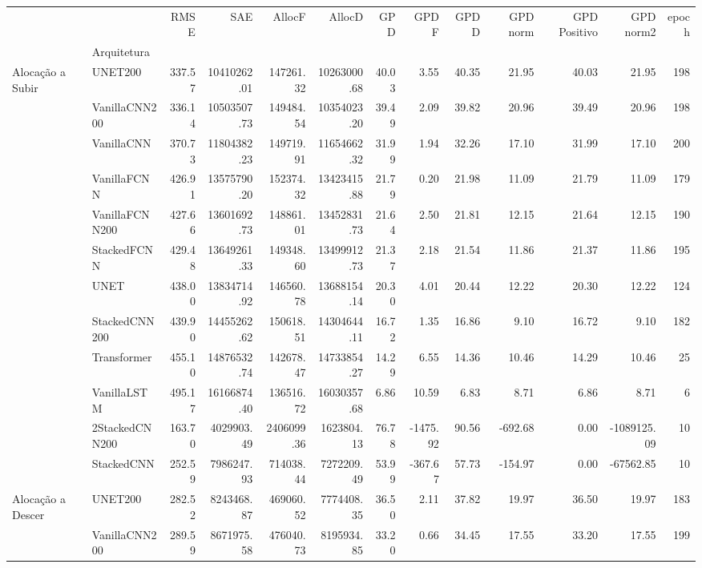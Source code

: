 \begin{tabular}{llrrrrrrrrrrr}
\toprule
 &  & RMSE & SAE & AllocF & AllocD & GPD & GPD F & GPD D & GPD norm & GPD Positivo & GPD norm2 & epoch \\
 & Arquitetura &  &  &  &  &  &  &  &  &  &  &  \\
\midrule
\multirow[t]{12}{*}{Alocação a Subir} & UNET200 & 337.57 & 10410262.01 & 147261.32 & 10263000.68 & 40.03 & 3.55 & 40.35 & 21.95 & 40.03 & 21.95 & 198 \\
 & VanillaCNN200 & 336.14 & 10503507.73 & 149484.54 & 10354023.20 & 39.49 & 2.09 & 39.82 & 20.96 & 39.49 & 20.96 & 198 \\
 & VanillaCNN & 370.73 & 11804382.23 & 149719.91 & 11654662.32 & 31.99 & 1.94 & 32.26 & 17.10 & 31.99 & 17.10 & 200 \\
 & VanillaFCNN & 426.91 & 13575790.20 & 152374.32 & 13423415.88 & 21.79 & 0.20 & 21.98 & 11.09 & 21.79 & 11.09 & 179 \\
 & VanillaFCNN200 & 427.66 & 13601692.73 & 148861.01 & 13452831.73 & 21.64 & 2.50 & 21.81 & 12.15 & 21.64 & 12.15 & 190 \\
 & StackedFCNN & 429.48 & 13649261.33 & 149348.60 & 13499912.73 & 21.37 & 2.18 & 21.54 & 11.86 & 21.37 & 11.86 & 195 \\
 & UNET & 438.00 & 13834714.92 & 146560.78 & 13688154.14 & 20.30 & 4.01 & 20.44 & 12.22 & 20.30 & 12.22 & 124 \\
 & StackedCNN200 & 439.90 & 14455262.62 & 150618.51 & 14304644.11 & 16.72 & 1.35 & 16.86 & 9.10 & 16.72 & 9.10 & 182 \\
 & Transformer & 455.10 & 14876532.74 & 142678.47 & 14733854.27 & 14.29 & 6.55 & 14.36 & 10.46 & 14.29 & 10.46 & 25 \\
 & VanillaLSTM & 495.17 & 16166874.40 & 136516.72 & 16030357.68 & 6.86 & 10.59 & 6.83 & 8.71 & 6.86 & 8.71 & 6 \\
 & 2StackedCNN200 & 163.70 & 4029903.49 & 2406099.36 & 1623804.13 & 76.78 & -1475.92 & 90.56 & -692.68 & 0.00 & -1089125.09 & 10 \\
 & StackedCNN & 252.59 & 7986247.93 & 714038.44 & 7272209.49 & 53.99 & -367.67 & 57.73 & -154.97 & 0.00 & -67562.85 & 10 \\
\cline{1-13}
\multirow[t]{12}{*}{Alocação a Descer} & UNET200 & 282.52 & 8243468.87 & 469060.52 & 7774408.35 & 36.50 & 2.11 & 37.82 & 19.97 & 36.50 & 19.97 & 183 \\
 & VanillaCNN200 & 289.59 & 8671975.58 & 476040.73 & 8195934.85 & 33.20 & 0.66 & 34.45 & 17.55 & 33.20 & 17.55 & 199 \\

\end{tabular}
